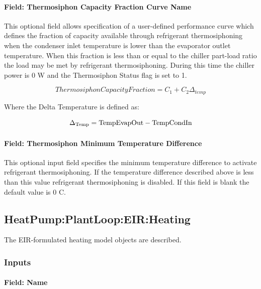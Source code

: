 \paragraph{Field: Thermosiphon Capacity Fraction Curve Name}\label{thermosiphon-capacity-fraction-curve-name5}

This optional field allows specification of a user-defined performance curve which defines the fraction of capacity available through refrigerant thermosiphoning when the condenser inlet temperature is lower than the evaporator outlet temperature. When this fraction is less than or equal to the chiller part-load ratio the load may be met by refrigerant thermosiphoning. During this time the chiller power is 0 W and the Thermosiphon Status flag is set to 1.

\begin{equation}
    ThermosiphonCapacityFraction = {C_1} + {C_2}{\Delta_{temp}}
\end{equation}

Where the Delta Temperature is defined as:

\begin{equation}
{\Delta_{{\rm{Temp}}}}
    = {\rm{TempEvapOut  -  TempCondIn }}
\end{equation}

\paragraph{Field: Thermosiphon Minimum Temperature Difference}\label{thermosiphon-minimum-temperature-difference5}

This optional input field specifies the minimum temperature difference to activate refrigerant thermosiphoning. If the temperature difference described above is less than this value refrigerant thermosiphoning is disabled. If this field is blank the default value is 0 C.

\subsection{HeatPump:PlantLoop:EIR:Heating}\label{plhp_eir_heating}

The EIR-formulated heating model objects are described.

\subsubsection{Inputs}\label{plhp_eir_heating_inputs}

\paragraph{Field: Name}\label{plhp_eir_heating_inputs_name}

